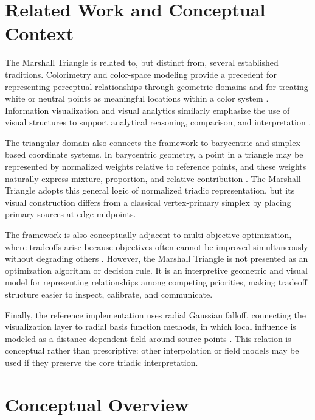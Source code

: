\documentclass[preprints,article,submit,pdftex,oneauthor]{Definitions/mdpi}
\begin{document}
\section{Related Work and Conceptual Context}

The Marshall Triangle is related to, but distinct from, several established traditions. Colorimetry and color-space modeling provide a precedent for representing perceptual relationships through geometric domains and for treating white or neutral points as meaningful locations within a color system \citep{maxwell1860,cie1931,smithguild1931}. Information visualization and visual analytics similarly emphasize the use of visual structures to support analytical reasoning, comparison, and interpretation \citep{card1999,thomas2005,ware2012}.

The triangular domain also connects the framework to barycentric and simplex-based coordinate systems. In barycentric geometry, a point in a triangle may be represented by normalized weights relative to reference points, and these weights naturally express mixture, proportion, and relative contribution \citep{mobius1827,farin1990}. The Marshall Triangle adopts this general logic of normalized triadic representation, but its visual construction differs from a classical vertex-primary simplex by placing primary sources at edge midpoints.

The framework is also conceptually adjacent to multi-objective optimization, where tradeoffs arise because objectives often cannot be improved simultaneously without degrading others \citep{miettinen1999,deb2001}. However, the Marshall Triangle is not presented as an optimization algorithm or decision rule. It is an interpretive geometric and visual model for representing relationships among competing priorities, making tradeoff structure easier to inspect, calibrate, and communicate.

Finally, the reference implementation uses radial Gaussian falloff, connecting the visualization layer to radial basis function methods, in which local influence is modeled as a distance-dependent field around source points \citep{hardy1971,fasshauer2007}. This relation is conceptual rather than prescriptive: other interpolation or field models may be used if they preserve the core triadic interpretation.

\section{Conceptual Overview}
\end{document}
